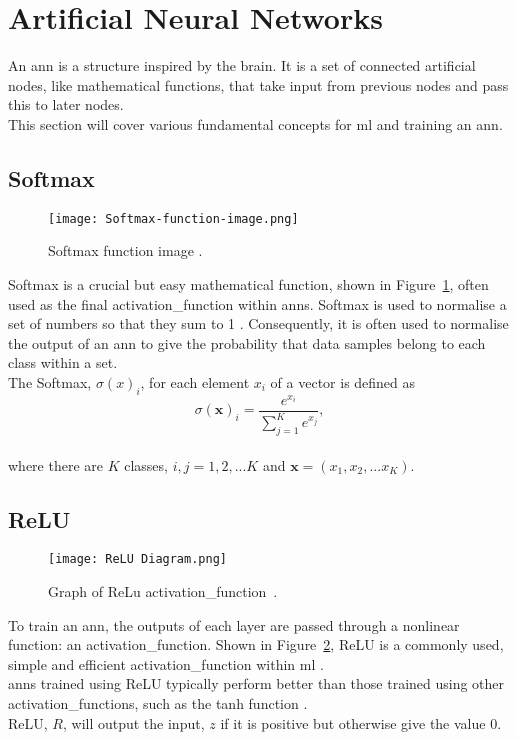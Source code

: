 \section{Artificial Neural Networks}
An \acrfull{ann} is a structure inspired by the brain. It is a set of connected artificial nodes, like mathematical functions, that take input from previous nodes and pass this to later nodes.\\
This section will cover various fundamental concepts for \acrshort{ml} and training an \acrshort{ann}.
\subsection{Softmax}
\begin{figure}
\centering
\texttt{[image: Softmax-function-image.png]}
\caption[Softmax function image.]{Softmax function image \cite{softmax_diagram}.}
\label{fig:softmax}
\end{figure}
Softmax is a crucial but easy mathematical function, shown in Figure~\ref{fig:softmax}, often used as the final \gls{activation_function} within \acrshort{anns}. Softmax is used to normalise a set of numbers so that they sum to 1 \cite{softmax}. Consequently, it is often used to normalise the output of an \acrshort{ann} to give the probability that data samples belong to each class within a set.\\
The Softmax, $\sigma(x)_i$, for each element $x_i$ of a vector is defined as
\[\sigma(\mathbf{x})_i = \frac{e^{x_i}}{\sum^{K}_{j=1}e^{x_j}},\]\\
where there are $K$ classes, $i, j = 1,2,...K$ and $\mathbf{x} = (x_1, x_2,...x_K)$.
\subsection{ReLU}
\label{sec: relu}
\begin{figure}
\centering
\texttt{[image: ReLU Diagram.png]}
\caption[Graph of ReLu \gls{activation_function}.]{Graph of ReLu \gls{activation_function}~\cite{relu_diagram}.}
\label{fig:ReLU}
\end{figure}
To train an \acrshort{ann}, the outputs of each layer are passed through a nonlinear function: an \gls{activation_function}. Shown in Figure~\ref{fig:ReLU}, ReLU is a commonly used, simple and efficient \gls{activation_function} within \acrshort{ml} \cite{relu_description}.\\
\acrshort{anns} trained using ReLU typically perform better than those trained using other \gls{activation_function}s, such as the tanh function \cite{relu_is_the_best}.\\
ReLU, $R$, will output the input, $z$ if it is positive but otherwise give the value 0.
